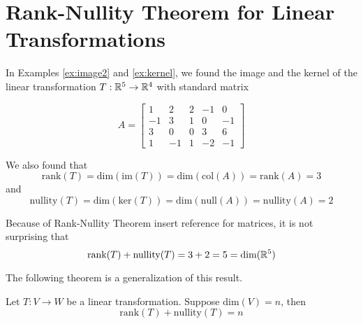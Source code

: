 \documentclass{ximera}
\begin{document}
\section*{Rank-Nullity Theorem for Linear Transformations}

In Examples \ref{ex:image2} and \ref{ex:kernel}, we found the image and the kernel of the linear transformation $T:\mathbb{R}^5\rightarrow \mathbb{R}^4$ with standard matrix

$$A=\begin{bmatrix}1 & 2 & 2 &-1 & 0\\-1 & 3 & 1 & 0 & -1\\3 & 0 & 0 & 3 & 6\\ 1 & -1 & 1 & -2 & -1\end{bmatrix}$$

We also found that
$$\text{rank}(T)=\text{dim}(\text{im}(T))=\text{dim}(\text{col}(A))=\text{rank}(A)=3$$
and
$$\text{nullity}(T)=\text{dim}(\text{ker}(T))=\text{dim}(\text{null}(A))=\text{nullity}(A)=2$$

Because of Rank-Nullity Theorem {\color{red} insert reference} for matrices, it is not surprising that 
$$\text{rank}(T)+\text{nullity}(T)=3+2=5=\text{dim}(\mathbb{R}^5)$$


The following theorem is a generalization of this result.

\begin{theorem}
Let $T:V\rightarrow W$ be a linear transformation.  Suppose $\text{dim}(V)=n$, then
$$\text{rank}(T)+\text{nullity}(T)=n$$
\end{theorem}
\end{document}
